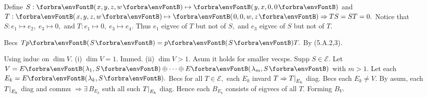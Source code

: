 \ChEnd

\vspace{4pt}

Define $S:\Par{x,y,z,w}\mapsto\Par{y,x,0,0}$ and $T:\Par{x,y,z,w}\mapsto\Par{0,0,w,z}\Rightarrow TS=ST=0.$\parSol{}
Notice that $S:e_1\mapsto e_2,\;e_3\mapsto 0,$ and $T:e_1\mapsto 0,\;e_3\mapsto e_4.$\parSol{}
Thus ${e_1}$ eigvec of $T$ but not of $S,$ and ${e_3}$ eigvec of $S$ but not of $T.$
\SepLine

Becs $Tp\Par{S}=p\Par{S}T.$ By (5.A.2,3).\PfEnd
\SepLine

Using induc on $\dim V.$ (i) $\dim V=1.$ Immed. (ii) $\dim V>1.$ Asum it holds for smaller vecsps.\parSol{}
Supp $S\in\mathcal{E}.$ Let $V=E\Par{\lambda_1,S}\oplus\cdots\oplus E\Par{\lambda_m,S}$ with $m>1.$\parSol{}
Let each $E_k=E\Par{\lambda_k,S}.$ Becs for all $T\in\mathcal{E},$ each $E_k$ invard $T\Rightarrow T\text{\normalsize|}_{E_k}$ diag.\parSol{}
Becs each $E_k\neq V.$ By asum, each $T\text{\normalsize|}_{E_k}$ diag and commu $\Rightarrow\exists\,B_{E_k}$ suth all such $T\text{\normalsize|}_{E_k}$ diag.\parSol{}
Hence each $B_{E_k}$ consists of eigvecs of all $T.$ Forming $B_V.$\PfEnd
\SepLine

\SepLine

